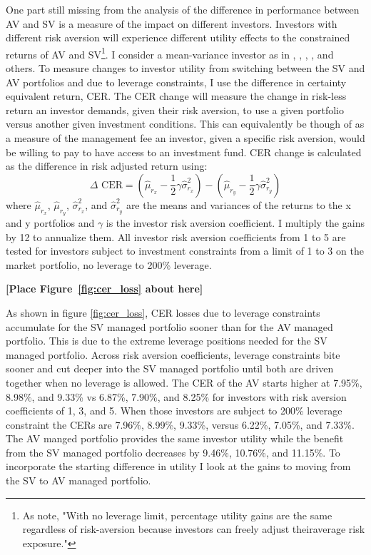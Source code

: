 One part still missing from the analysis of the difference in performance between AV and SV is a measure of the impact on different investors. Investors with different risk aversion will experience different utility effects to the constrained returns of AV and SV\footnote{As \citet{moreira_volatility-managed_2017} note, "With no leverage limit, percentage utility gains are the same regardless of risk-aversion because investors can freely adjust theiraverage risk exposure."}. I consider a mean-variance investor as in \cite{Kandel1996}, \cite{Campbell2008}, \cite{Ferreira2011}, \cite{Rapach2016}, and others. To measure changes to investor utility from switching between the SV and AV portfolios and due to leverage constraints, I use the difference in certainty equivalent return, CER. The CER change will measure the change in risk-less return an investor demands, given their risk aversion, to use a given portfolio versus another given investment conditions. This can equivalently be though of as a measure of the management fee an investor, given a specific risk aversion, would be willing to pay to have access to an investment fund. CER change is calculated as the difference in risk adjusted return using:
\begin{equation}
\Delta \text{ CER} = \left(\hat \mu_{r_{x}} - \frac{1}{2}\gamma\hat \sigma^{2}_{r_{x}}\right) - \left(\hat \mu_{r_{y}} - \frac{1}{2}\gamma\hat \sigma^{2}_{r_{y}}\right)
\end{equation}
where $\hat \mu_{r_{x}}$, $\hat \mu_{r_{y}}$, $\hat \sigma^{2}_{r_{x}}$, and $\hat \sigma^{2}_{r_{y}}$ are the means and
variances of the returns to the x and y portfolios and $\gamma$ is the investor risk aversion coefficient. I multiply the gains by 12 to annualize them. All investor risk aversion coefficients from 1 to 5 are tested for investors subject to investment constraints from a limit of 1 to 3 on the market portfolio, no leverage to 200\% leverage.

\bigskip
\centerline{\bf [Place Figure~\ref{fig:cer_loss} about here]}
\bigskip

As shown in figure \ref{fig:cer_loss}, CER losses due to leverage constraints accumulate for the SV managed portfolio sooner than for the AV managed portfolio. This is due to the extreme leverage positions needed for the SV managed portfolio. Across risk aversion coefficients, leverage constraints bite sooner and cut deeper into the SV managed portfolio until both are driven together when no leverage is allowed. The CER of the AV starts higher at 7.95\%, 8.98\%, and 9.33\% vs 6.87\%, 7.90\%, and 8.25\% for investors with risk aversion coefficients of 1, 3, and 5. When those investors are subject to 200\% leverage constraint the CERs are 7.96\%, 8.99\%, 9.33\%, versus 6.22\%, 7.05\%, and 7.33\%. The AV manged portfolio provides the same investor utility while the benefit from the SV managed portfolio decreases by 9.46\%, 10.76\%, and 11.15\%. To incorporate the starting difference in utility I look at the gains to moving from the SV to AV managed portfolio. 

